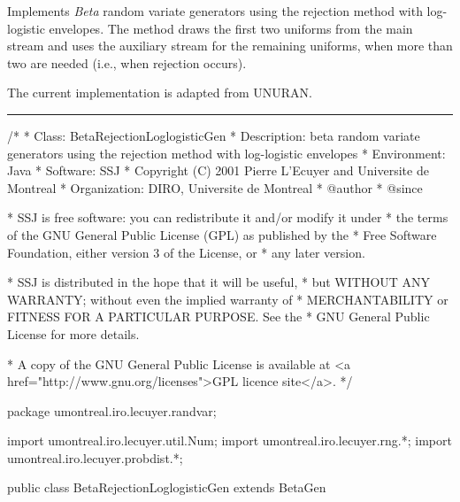 
Implements {\em Beta\/} random variate generators using
the rejection method with log-logistic envelopes.
The method draws the first two uniforms from the main stream
and uses the auxiliary stream for the remaining uniforms, 
when more than two are needed (i.e., when rejection occurs).
\begin{detailed}
The current implementation is adapted from UNURAN.
\end{detailed}

\bigskip\hrule

\begin{code}
\begin{hide}
/*
 * Class:        BetaRejectionLoglogisticGen
 * Description:  beta random variate generators using the rejection method
                 with log-logistic envelopes
 * Environment:  Java
 * Software:     SSJ 
 * Copyright (C) 2001  Pierre L'Ecuyer and Universite de Montreal
 * Organization: DIRO, Universite de Montreal
 * @author       
 * @since

 * SSJ is free software: you can redistribute it and/or modify it under
 * the terms of the GNU General Public License (GPL) as published by the
 * Free Software Foundation, either version 3 of the License, or
 * any later version.

 * SSJ is distributed in the hope that it will be useful,
 * but WITHOUT ANY WARRANTY; without even the implied warranty of
 * MERCHANTABILITY or FITNESS FOR A PARTICULAR PURPOSE.  See the
 * GNU General Public License for more details.

 * A copy of the GNU General Public License is available at
   <a href="http://www.gnu.org/licenses">GPL licence site</a>.
 */
\end{hide}
package umontreal.iro.lecuyer.randvar;\begin{hide}
import umontreal.iro.lecuyer.util.Num;
import umontreal.iro.lecuyer.rng.*;
import umontreal.iro.lecuyer.probdist.*;
\end{hide}

public class BetaRejectionLoglogisticGen extends BetaGen \begin{hide} {
    
   private RandomStream auxStream;
   // Parameters for rejection with log-logistic envelopes
   private static final int bb = 0;
   private static final int bc = 1;
   private double am;
   private double bm;
   private double al;
   private double alnam;
   private double be;
   private double ga;
   private double si;
   private double rk1;
   private double rk2;

\end{hide}
\end{code}

